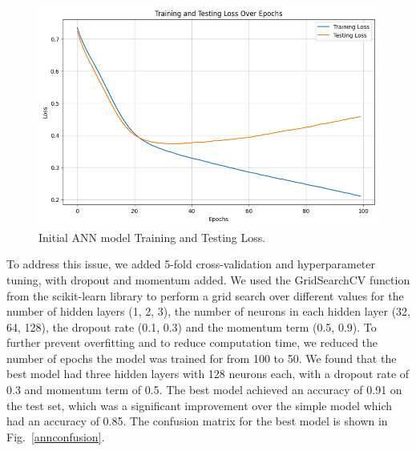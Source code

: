 \begin{figure}[htbp]
    \centerline{\includegraphics[scale=0.435]{img/annoverfitting.png}}
    \caption{Initial ANN model Training and Testing Loss.}\label{annoverfitting}
\end{figure}

To address this issue, we added 5-fold cross-validation and hyperparameter tuning, with dropout and momentum added. We used the GridSearchCV function from the scikit-learn library to perform a grid search over different values for the number of hidden layers (1, 2, 3), the number of neurons in each hidden layer (32, 64, 128), the dropout rate (0.1, 0.3) and the momentum term (0.5, 0.9). To further prevent overfitting and to reduce computation time, we reduced the number of epochs the model was trained for from 100 to 50. We found that the best model had three hidden layers with 128 neurons each, with a dropout rate of 0.3 and momentum term of 0.5. The best model achieved an accuracy of 0.91 on the test set, which was a significant improvement over the simple model which had an accuracy of 0.85. The confusion matrix for the best model is shown in Fig.~\ref{annconfusion}.

